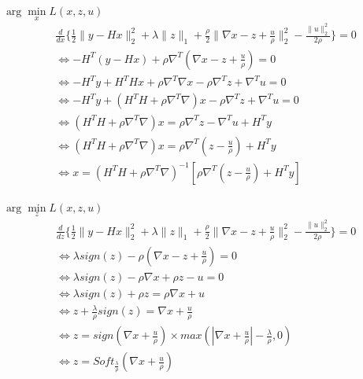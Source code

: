\begin{frame}{$\arg\min\limits_{x} {L(x, z, u)}$}
\begin{align*}
&\frac{d}{dx} \{
    \frac{1}{2} \lVert y - Hx \rVert_{2}^{2} 
    + \lambda \lVert z \rVert_{1} 
    + \frac{\rho}{2} \lVert \nabla x - z + \frac{u}{\rho} \rVert_{2}^{2} 
    - \frac{\lVert u \rVert_{2}^{2}}{2\rho}
\} = 0 \\
&\iff -H^{T} (y - Hx) + \rho  \nabla^{T}(\nabla x - z + \frac{u}{\rho}) = 0 \\
&\iff -H^{T} y + H^{T}Hx 
+ \rho \nabla^{T}\nabla x - \rho \nabla^{T} z + \nabla^{T} u = 0 \\
&\iff -H^{T} y + (H^{T}H + \rho \nabla^{T}\nabla) x 
- \rho \nabla^{T} z + \nabla^{T} u = 0 \\
&\iff (H^{T}H + \rho \nabla^{T}\nabla) x 
= \rho \nabla^{T} z - \nabla^{T} u + H^{T} y \\
&\iff (H^{T}H + \rho \nabla^{T}\nabla) x 
= \rho \nabla^{T} (z - \frac{u}{\rho}) + H^{T} y \\
&\iff x = (H^{T}H + \rho \nabla^{T}\nabla)^{-1} 
[\rho \nabla^{T} (z - \frac{u}{\rho}) + H^{T} y] \\
\end{align*}
\end{frame}

\begin{frame}{$\arg\min\limits_{z} {L(x, z, u)}$}
\begin{align*}
&\frac{d}{dz} \{
    \frac{1}{2} \lVert y - Hx \rVert_{2}^{2} 
    + \lambda \lVert z \rVert_{1} 
    + \frac{\rho}{2} \lVert \nabla x - z + \frac{u}{\rho} \rVert_{2}^{2} 
    - \frac{\lVert u \rVert_{2}^{2}}{2\rho}
\} = 0 \\
&\iff \lambda sign(z) - \rho (\nabla x - z + \frac{u}{\rho})  = 0 \\
&\iff \lambda sign(z) - \rho \nabla x + \rho z - u  = 0 \\
&\iff \lambda sign(z) + \rho z  = \rho \nabla x + u \\
&\iff  z + \frac{\lambda}{\rho} sign(z) = \nabla x + \frac{u}{\rho} \\
&\iff  z = sign(\nabla x + \frac{u}{\rho}) 
\times max(|\nabla x + \frac{u}{\rho}| 
- \frac{\lambda}{\rho}, 0) \\
&\iff  z = Soft_{\frac{\lambda}{\rho}}(\nabla x + \frac{u}{\rho})
\end{align*}
\end{frame}


